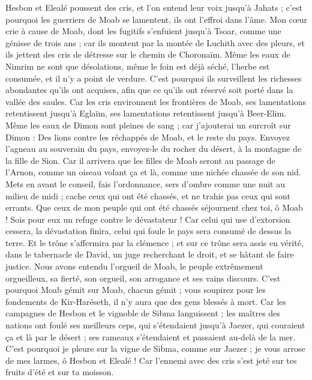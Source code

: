 \begin{multicols}{2}
Hesbon et Elealé poussent des cris, et l'on entend leur voix jusqu'à Jahats ; c'est pourquoi les guerriers de Moab se lamentent, ils ont l'effroi dans l'âme.
Mon cœur crie à cause de Moab, dont les fugitifs s'enfuient jusqu'à Tsoar, comme une génisse de trois ans ; car ils montent par la montée de Luchith avec des pleurs, et ils jettent des cris de détresse sur le chemin de Choronaïm.
Même les eaux de Nimrim ne sont que désolations, même le foin est déjà séché, l'herbe est consumée, et il n'y a point de verdure.
C'est pourquoi ils surveillent les richesses abondantes qu'ils ont acquises, afin que ce qu'ils ont réservé soit porté dans la vallée des saules.
Car les cris environnent les frontières de Moab, ses lamentations retentissent jusqu'à Eglaïm, ses lamentations retentissent jusqu'à Beer-Elim.
Même les eaux de Dimon sont pleines de sang ; car j'ajouterai un surcroît sur Dimon : Des lions contre les réchappés de Moab, et le reste du pays.
\VerseOne{}Envoyez l'agneau au souverain du pays, envoyez-le du rocher du désert, à la montagne de la fille de Sion.
Car il arrivera que les filles de Moab seront au passage de l'Arnon, comme un oiseau volant ça et là, comme une nichée chassée de son nid.
Mets en avant le conseil, fais l'ordonnance, sers d'ombre comme une nuit au milieu de midi ; cache ceux qui ont été chassés, et ne trahis pas ceux qui sont errants.
Que ceux de mon peuple qui ont été chassés séjournent chez toi, ô Moab ! Sois pour eux un refuge contre le dévastateur ! Car celui qui use d'extorsion cessera, la dévastation finira, celui qui foule le pays sera consumé de dessus la terre.
Et le trône s'affermira par la clémence ; et sur ce trône sera assis en vérité, dans le tabernacle de David, un juge recherchant le droit, et se hâtant de faire justice.
Nous avons entendu l'orgueil de Moab, le peuple extrêmement orgueilleux, sa fierté, son orgueil, son arrogance et ses vains discours.
C'est pourquoi Moab gémit sur Moab, chacun gémit ; vous soupirez pour les fondements de Kir-Haréseth, il n'y aura que des gens blessés à mort.
Car les campagnes de Hesbon et le vignoble de Sibma languissent ; les maîtres des nations ont foulé ses meilleurs ceps, qui s'étendaient jusqu'à Jaezer, qui couraient ça et là par le désert ; ses rameaux s'étendaient et passaient au-delà de la mer.
C'est pourquoi je pleure sur la vigne de Sibma, comme sur Jaezer ; je vous arrose de mes larmes, ô Hesbon et Elealé ! Car l'ennemi avec des cris s'est jeté sur tes fruits d'été et sur ta moisson.

\end{multicols}
